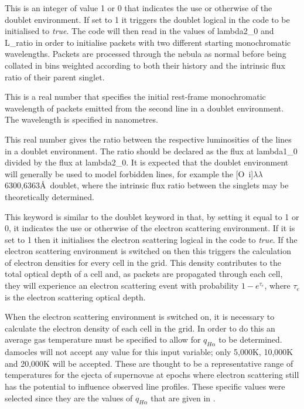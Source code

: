 
This is an integer of value 1 or 0 that indicates the use or otherwise of the doublet environment.  If set to 1 it triggers the doublet logical in the code to be initialised to \textit{true}.  The code will then read in the values of {lambda2\_0} and {L\_ratio} in order to initialise packets with two different starting monochromatic wavelengths.  Packets are processed through the nebula as normal before being collated in bins weighted according to both their history and the intrinsic flux ratio of their parent singlet.


This is a real number that specifies the initial rest-frame monochromatic wavelength of packets emitted from the second line in a doublet environment.  The wavelength is specified in nanometres.


This real number gives the ratio between the respective luminosities of the lines in a doublet environment.  The ratio should be declared as the flux at lambda1\_0 divided by the flux at lambda2\_0.  It is expected that the doublet environment will generally be used to model forbidden lines, for example the [O~{\sc i}]$\lambda\lambda$6300,6363\AA\ doublet, where the intrinsic flux ratio between the singlets may be theoretically determined.

\vspace{0.8cm}


This keyword is similar to the doublet keyword in that, by setting it equal to 1 or 0, it indicates the use or otherwise of the electron scattering environment.  If it is set to 1 then it initialises the electron scattering logical in the code to \textit{true}.  If the electron scattering environment is switched on then this triggers the calculation of electron densities for every cell in the grid.  This density contributes to the total optical depth of a cell and, as packets are propagated through each cell, they will experience an electron scattering event with probability $1-e^{\tau_e}$, where $\tau_e$ is the electron scattering optical depth.


 When the electron scattering environment is switched on, it is necessary to calculate the electron density of each cell in the grid.  In order to do this an average gas temperature must be specified to allow for $q_{H\alpha}$ to be determined.  {\sc damocles} will not accept any value for this input variable; only 5,000K, 10,000K and 20,000K will be accepted.  These are thought to be a representative range of temperatures for the ejecta of supernovae at epochs where electron scattering still has the potential to influence observed line profiles.  These specific values were selected since they are the values of $q_{H\alpha}$ that are given in \citet{Osterbrock2006}.

